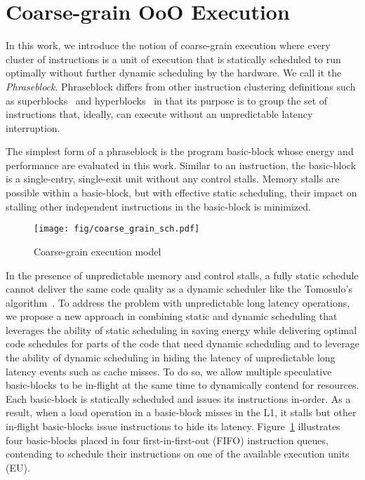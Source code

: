 \section{Coarse-grain OoO Execution}
\label{sec:course_grain}

In this work, we introduce the notion of coarse-grain execution where every
cluster of instructions is a unit of execution that is statically scheduled to
run optimally without further dynamic scheduling by the hardware. We call it the
{\it{Phraseblock}}. Phraseblock differs from other instruction clustering
definitions such as superblocks~\cite{superblock} and
hyperblocks~\cite{hyperblock} in that its purpose is to group the set of
instructions that, ideally, can execute without an unpredictable latency
interruption. 

The simplest form of a phraseblock is the program basic-block whose energy and
performance are evaluated in this work. Similar to an instruction, the
basic-block is a single-entry, single-exit unit without any control stalls.
Memory stalls are possible within a basic-block, but with effective static
scheduling, their impact on stalling other independent instructions in the
basic-block is minimized.

\begin{figure}
	\centering
	\texttt{[image: fig/coarse\_grain\_sch.pdf]} 
	\caption{Coarse-grain execution model}
	\label{fig:coarse_grain_sch}
\end{figure}

In the presence of unpredictable memory and control stalls, a fully static
schedule cannot deliver the same code quality as a dynamic scheduler like the
Tomosulo's algorithm~\cite{tomasulo}. To address the problem with unpredictable
long latency operations, we propose a new approach in combining static and
dynamic scheduling that leverages the ability of static scheduling in saving
energy while delivering optimal code schedules for parts of the code that need
dynamic scheduling and to leverage the ability of dynamic scheduling in hiding
the latency of unpredictable long latency events such as cache misses. To do so,
    we allow multiple speculative basic-blocks to be in-flight at the same time
    to dynamically contend for resources.  Each basic-block is statically
    scheduled and issues its instructions in-order.  As a result, when a load
    operation in a basic-block misses in the L1, it stalls but other in-flight
    basic-blocks issue instructions to hide its latency.
    Figure~\ref{fig:coarse_grain_sch} illustrates four basic-blocks placed in
    four first-in-first-out (FIFO) instruction queues, contending to schedule
    their instructions on one of the available execution units (EU).
